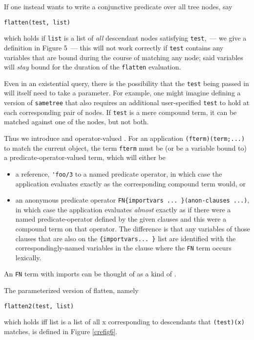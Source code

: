 If one instead wants to write a conjunctive predicate over all tree nodes, say
\begin{verbatim}
flatten(test, list)
\end{verbatim}
which holds if \verb|list| is a list of \emph{all} descendant nodes satisfying
\verb|test|,\ --- we give a definition in Figure 5\ --- this will not work
correctly if \verb|test| contains any variables that are bound during the course
of matching any node; said variables will \emph{stay} bound for the duration of
the \verb|flatten| evaluation.

Even in an existential query, there is the possibility that the \verb|test|
being passed in will itself need to take a parameter. For example, one might
imagine defining a version of \verb|sametree| that also requires an additional
user-specified \verb|test| to hold at each corresponding pair of nodes. If
\verb|test| is a mere compound term, it can be matched against one of the nodes,
but not both.

Thus we introduce  and
operator-valued . For an application
\verb|(fterm)(term;...)| to match the current object, the term \verb|fterm| must
be (or be a variable bound to) a predicate-operator-valued term, which will
either be
\begin{itemize}
  \item a reference, \verb|'foo/3| to a named predicate operator,
in which case the application evaluates exactly as the corresponding compound
term would, or
\item an anonymous predicate operator
\verb|FN{importvars ... }(anon-clauses ...)|, in which case the application
evaluates \emph{almost} exactly as if there were a named predicate-operator
defined by the given clauses and this were a compound term on that operator. The
difference is that any variables of those clauses that are also on the
\verb|{importvars... }| list are identified with the correspondingly-named
variables in the clause where the \verb|FN| term occurs lexically.
\end{itemize}

An \verb|FN| term with imports can be thought of as a kind of
.

The parameterized version of flatten, namely
\begin{verbatim}
flatten2(test, list)
\end{verbatim}
which holds iff list is a list of all x corresponding to
descendants that \verb|(test)(x)| matches, is defined in Figure
\ref{crefig6}.

